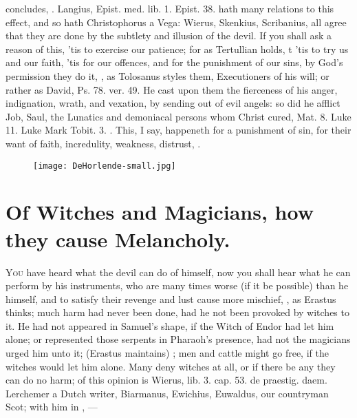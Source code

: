 {{concludes, . Langius, Epist. med. lib. 1. Epist. 38. hath many relations to this effect, and
so hath Christophorus a Vega: Wierus, Skenkius, Scribanius, all agree
that they are done by the subtlety and illusion of the devil. If you
shall ask a reason of this, 'tis to exercise our patience; for as
Tertullian holds, t 'tis to try us and our
faith, 'tis for our offences, and for the punishment of our sins, by
God's permission they do it, , as
Tolosanus styles them, Executioners of his will; or rather as
David, Ps. 78. ver. 49. He cast upon them the fierceness of his anger,
indignation, wrath, and vexation, by sending out of evil angels: so did
he afflict Job, Saul, the Lunatics and demoniacal persons whom Christ
cured, Mat.  8. Luke  11. Luke  Mark  Tobit.  3. \etc{}.
This, I say, happeneth for a punishment of sin, for their want of
faith, incredulity, weakness, distrust, \etc{}.

\cleartoleftpage{}
\begin{figure}[p]
  \begingroup
  \centering
  \texttt{[image: DeHorlende-small.jpg]}
  \label{fig:dehorlende}
\end{figure}

\clearpage{}
\thispagestyle{titleontop}

\section[Witches and Magicians]{Of Witches and Magicians, how they cause Melancholy.}

\lettrine{Y}{ou} have heard what the devil can do of himself, now you shall hear
what he can perform by his instruments, who are many times worse (if it
be possible) than he himself, and to satisfy their revenge and lust
cause more mischief, , as Erastus thinks; much harm had never been
done, had he not been provoked by witches to it. He had not appeared in
Samuel's shape, if the Witch of Endor had let him alone; or represented
those serpents in Pharaoh's presence, had not the magicians urged him
unto it;  (Erastus
maintains) ; men and cattle might go free, if the
witches would let him alone. Many deny witches at all, or if there be
any they can do no harm; of this opinion is Wierus, lib. 3. cap. 53. \textlatin{de
praestig. daem.} \Austin{} Lerchemer a Dutch writer, Biarmanus, Ewichius,
Euwaldus, our countryman Scot; with him in \Horace{},
---

}}
